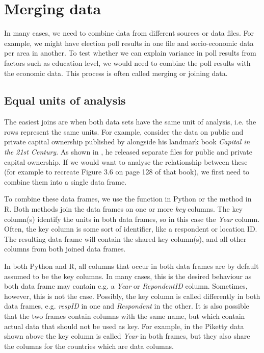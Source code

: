 \section{Merging data}

In many cases, we need to combine data from different sources or data files.
For example, we might have election poll results in one file and socio-economic data per area in another.
To test whether we can explain variance in poll results from factors such as education level,
we would need to combine the poll results with the economic data.
This process is often called merging or joining data.

\subsection{Equal units of analysis}


The easiest joins are when both data sets have the same unit of analysis,
i.e. the rows represent the same units.
For example, consider the data on public and private capital ownership published by
\cite{Piketty} alongside his landmark book \emph{Capital in the 21st Century}.
As shown in , he released separate files for public and private capital ownership.
If we would want to analyse the relationship between these (for example to recreate Figure 3.6 on page 128 of that book),
we first need to combine them into a single data frame.

To combine these data frames, we use the  function  in Python or the  method  in R.
Both methods join the data frames on one or more \emph{key} columns.
The key column(s) identify the units in both data frames, so in this case the \emph{Year} column.
Often, the key column is some sort of identifier, like a respondent or location ID.
The resulting data frame will contain the shared key column(s), and all other columns from both joined data frames.

In both Python and R, all columns that occur in both data frames are by default assumed to be the key columns.
In many cases, this is the desired behaviour as both data frame may contain e.g. a \emph{Year} or \emph{RepondentID} column.
Sometimes, however, this is not the case.
Possibly, the key column is called differently in both data frames, e.g. \emph{respID} in one and \emph{Respondent} in the other. 
It is also possible that the two frames contain columns with the same name,
but which contain actual data that should not be used as key.
For example, in the Piketty data shown above the key column is called \emph{Year} in both frames,
but they also share the columns for the countries which are data columns.

